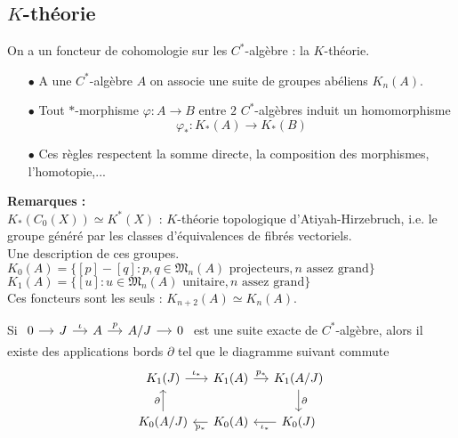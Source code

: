 \documentclass{beamer}
\begin{document}
\subsection{$K$-théorie}
\begin{frame}
On a un foncteur de cohomologie sur les $C^*$-algèbre : la $K$-théorie.
\begin{itemize}
\item[$\bullet$] A une $C^*$-algèbre $A$ on associe une suite de groupes abéliens $K_n(A)$.
\item[$\bullet$] Tout $*$-morphisme $\varphi : A\rightarrow B$ entre $2$ $C^*$-algèbres induit un homomorphisme 
\[\varphi_*: K_*(A)\rightarrow K_*(B)\]
\item[$\bullet$] Ces règles respectent la somme directe, la composition des morphismes, l'homotopie,... 
\end{itemize}
\textbf{Remarques :}\\
$K_*(C_0(X))\simeq K^*(X)$ : $K$-théorie topologique d'Atiyah-Hirzebruch, i.e. le groupe généré par les classes d'équivalences de fibrés vectoriels.\\
Une description de ces groupes.
$K_0(A) = \{[p]-[q] : p,q\in \mathfrak M_n(A) \text{ projecteurs} ,n\text{ assez grand}\}$\\
$K_1(A) = \{[u] : u\in \mathfrak M_n(A) \text{ unitaire} ,n\text{ assez grand}\}$\\
Ces foncteurs sont les seuls : $K_{n+2}(A)\simeq K_n(A)$.
\end{frame}

\begin{frame}
\begin{thm}
Si $\begin{tikzcd}[ampersand replacement=\&,column sep = small]
0 \arrow{r} \& J \arrow{r}{\iota} \& A\arrow{r}{p} \& A/J\arrow{r} \& 0  
\end{tikzcd}$ est une suite exacte de $C^*$-algèbre, alors il existe des applications bords $\partial$ tel que le diagramme suivant commute
\[\begin{tikzcd}[ampersand replacement=\&,column sep = small]
 K_1(J)\arrow{r}{\iota_*}\& K_1(A)\arrow{r}{p_*}\& K_1(A/J)\arrow{d}{\partial}\\
K_0(A/J)\arrow{u}{\partial}\& K_0(A)\arrow{l}{p_*}\& K_0(J)\arrow{l}{\iota_*}
\end{tikzcd}\]
\end{thm}
\end{frame}
\end{document}
